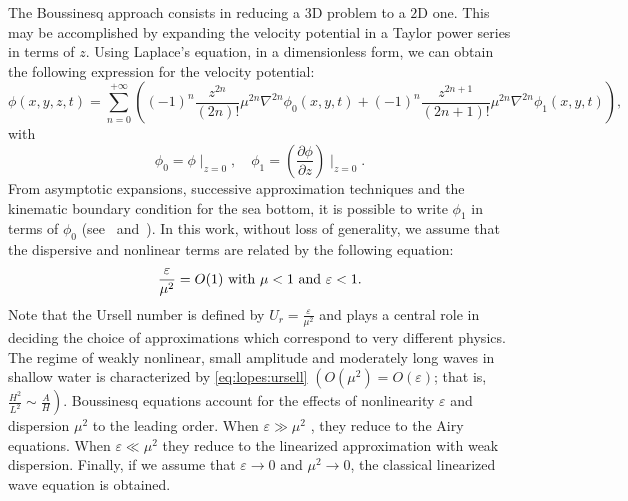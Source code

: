 The Boussinesq approach consists in reducing a $3$D problem
to a $2$D one.  This may be accomplished by expanding the
velocity potential in a Taylor power series in terms of $z$.
Using Laplace's equation, in a dimensionless form, we can
obtain the following expression for the velocity potential:
\begin{equation}
\phi(x,y,z,t)=\sum_{n=0}^{+\infty}\left((-1)^n\frac{z^{2n}}{(2n)!}\mu^{2n}\nabla^{2n}\phi_0(x,y,t)+
(-1)^n
\frac{z^{2n+1}}{(2n+1)!}\mu^{2n}\nabla^{2n}\phi_1(x,y,t)\right),
\end{equation}
with
\begin{equation}
\phi_0=\phi\mid_{ z=0},\quad
\phi_1=\left(\frac{\partial \phi}{\partial z}\right)\mid_{z=0}\!.
\end{equation}
From asymptotic expansions, successive approximation
techniques and the kinematic boundary condition for the sea
bottom, it is possible to write $\phi_1$ in terms of
$\phi_0$ (see~\citet{ChenLiu1994} and~\citet{ZhaoTengCheng2004}).
In this work, without loss of generality, we assume that the
dispersive and nonlinear terms are related by the following
equation:
\begin{equation}\label{eq:lopes:ursell}
\frac{\varepsilon}{\mu^2}=O(1)\ {\rm with}\ \mu<1\ {\rm
  and}\ \varepsilon<1.
\end{equation}
Note that the Ursell number is defined by $\displaystyle
U_r=\frac{\varepsilon}{\mu^2}$ and plays a central role in deciding
the choice of approximations which correspond to very different
physics.  The regime of weakly nonlinear, small amplitude and
moderately long waves in shallow water is characterized by
\eqref{eq:lopes:ursell} $\left(O(\mu^2)=O(\varepsilon)\right.$; that is,
$\left.\frac{H^2}{L^2}\sim\frac{A}{H} \right)$. Boussinesq equations
account for the effects of nonlinearity $\varepsilon$ and dispersion
$\mu^2$ to the leading order.  When $\varepsilon\gg \mu^2$ , they
reduce to the Airy equations.  When $\varepsilon\ll \mu^2$ they reduce
to the linearized approximation with weak dispersion.  Finally, if we
assume that $\varepsilon\rightarrow 0$ and $\mu^2\rightarrow 0$, the
classical linearized wave equation is obtained.

